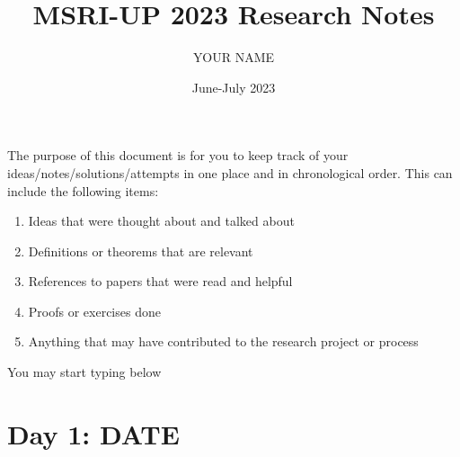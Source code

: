 \documentclass[11pt]{article}
\title{MSRI-UP 2023 Research Notes}
\author{YOUR NAME}
\date{June-July 2023}
\begin{document}
\maketitle
The purpose of this document is for you to keep track of your ideas/notes/solutions/attempts in one place and in chronological order. 
This can include the following items: 

\begin{enumerate}
    \item Ideas that were thought about and talked about 
    \item Definitions or theorems that are relevant 
    \item References to papers that were read and helpful 
    \item Proofs or exercises done 
    \item Anything that may have contributed to the research project or process
\end{enumerate}

You may start typing below

\section*{Day 1: DATE}
\end{document}

